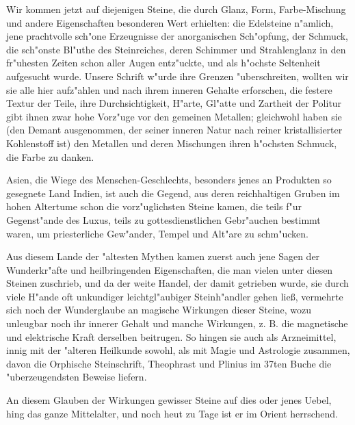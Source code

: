 \documentclass[a4paper, 11pt, oneside, polutonikogreek, german]{article}
\begin{document}
Wir kommen jetzt auf diejenigen Steine, die durch Glanz, Form, Farbe-Mischung und andere Eigenschaften besonderen Wert erhielten: die Edelsteine n"amlich, jene prachtvolle sch"one Erzeugnisse der anorganischen Sch"opfung, der Schmuck, die sch"onste Bl"uthe des Steinreiches, deren Schimmer und Strahlenglanz in den fr"uhesten Zeiten schon aller Augen entz"uckte, und als h"ochste Seltenheit aufgesucht wurde. Unsere Schrift w"urde ihre Grenzen "uberschreiten, wollten wir sie alle hier aufz"ahlen und nach ihrem inneren Gehalte erforschen, die festere Textur der Teile, ihre Durchsichtigkeit, H"arte, Gl"atte und Zartheit der Politur gibt ihnen zwar hohe Vorz"uge vor den gemeinen Metallen; gleichwohl haben sie (den Demant ausgenommen, der seiner inneren Natur nach reiner kristallisierter Kohlenstoff ist) den Metallen und deren Mischungen ihren h"ochsten Schmuck, die Farbe zu danken.

Asien, die Wiege des Menschen-Geschlechts, besonders jenes an Produkten so gesegnete Land Indien, ist auch die Gegend, aus deren reichhaltigen Gruben im hohen Altertume schon die vorz"uglichsten Steine kamen, die teils f"ur Gegenst"ande des Luxus, teils zu gottesdienstlichen Gebr"auchen bestimmt waren, um priesterliche Gew"ander, Tempel und Alt"are zu schm"ucken.

Aus diesem Lande der "altesten Mythen kamen zuerst auch jene Sagen der Wunderkr"afte und heilbringenden Eigenschaften, die man vielen unter diesen Steinen zuschrieb, und da der weite Handel, der damit getrieben wurde, sie durch viele H"ande oft unkundiger leichtgl"aubiger Steinh"andler gehen ließ, vermehrte sich noch der Wunderglaube an magische Wirkungen dieser Steine, wozu unleugbar noch ihr innerer Gehalt und manche Wirkungen, z. B. die magnetische und elektrische Kraft derselben beitrugen. So hingen sie auch als Arzneimittel, innig mit der "alteren Heilkunde sowohl, als mit Magie und Astrologie zusammen, davon die Orphische Steinschrift, Theophrast und Plinius im 37ten Buche die "uberzeugendsten Beweise liefern.

An diesem Glauben der Wirkungen gewisser Steine auf dies oder jenes Uebel, hing das ganze Mittelalter, und noch heut zu Tage ist er im Orient herrschend.
\end{document}
